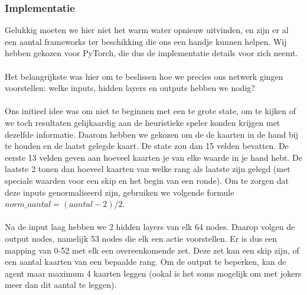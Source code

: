 \documentclass[11pt]{article}
\begin{document}
\subsubsection{Implementatie}
Gelukkig moeten we hier niet het warm water opnieuw uitvinden, en zijn er al een aantal frameworks ter beschikking die ons een handje kunnen helpen. Wij hebben gekozen voor PyTorch, die dus de implementatie details voor zich neemt.\\\\
Het belangrijkste was hier om te beslissen hoe we precies ons netwerk gingen voorstellen: welke inputs, hidden layers en outputs hebben we nodig?\\\\
Ons initieel idee was om niet te beginnen met een te grote state, om te kijken of we toch resultaten gelijkaardig aan de heuristieke speler konden krijgen met dezelfde informatie. Daarom hebben we gekozen om de de kaarten in de hand bij te houden en de laatst gelegde kaart. De state zou dan 15 velden bevatten. De eerste 13 velden geven aan hoeveel kaarten je van elke waarde in je hand hebt. De laatste 2 tonen dan hoeveel kaarten van welke rang als laatste zijn gelegd (met speciale waarden voor een skip en het begin van een ronde). Om te zorgen dat deze inputs genormaliseerd zijn, gebruiken we volgende formule $norm\_aantal = (aantal - 2)/2$.\\\\
Na de input laag hebben we 2 hidden layers van elk 64 nodes. Daarop volgen de output nodes, namelijk 53 nodes die elk een actie voorstellen. Er is dus een mapping van 0-52 met elk een overeenkomende zet. Deze zet kan een skip zijn, of een aantal kaarten van een bepaalde rang. Om de output te beperken, kan de agent maar maximum 4 kaarten leggen (ookal is het soms mogelijk om met jokers meer dan dit aantal te leggen).\\\\
\end{document}
